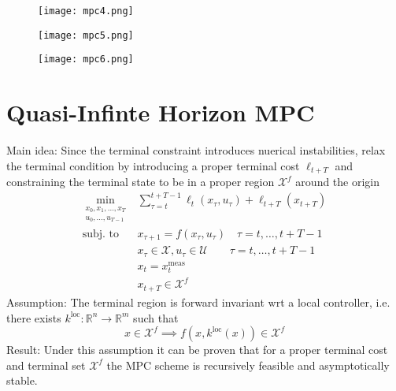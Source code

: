 \documentclass[openany]{book}
\newcommand{\R}{\mathbb{R}}               %
\theoremstyle{definition}
\theoremstyle{remark}
\begin{document}
\begin{figure}[ht]
    \centering
    \texttt{[image: mpc4.png]}
    \label{fig:mpc4}
\end{figure}

\begin{figure}[ht]
    \centering
    \texttt{[image: mpc5.png]}
    \label{fig:mpc5}
\end{figure}

\begin{figure}[ht]
    \centering
    \texttt{[image: mpc6.png]}
    \label{fig:mpc6}
\end{figure}

\pagebreak

\section{Quasi-Infinte Horizon MPC}
Main idea: Since the terminal constraint introduces nuerical instabilities, relax the terminal condition by introducing a proper terminal cost $\ell_{t+T}$ and constraining the terminal state to be in a proper region $\mathcal{X}^f$ around the origin
\begin{align*}
    \min_{\substack{x_0,x_1,\dots,x_T\\u_0,\dots,u_{T-1}}} & \displaystyle\sum_{\tau=t}^{t+T-1}\ell_t(x_\tau,u_\tau)+\ell_{t+T}(x_{t+T})\\
        \text{subj.\ to } & x_{\tau+1}=f(x_\tau,u_\tau) \quad \tau=t,\dots,t+T-1\\
                          & x_\tau \in \mathcal{X}, u_\tau \in \mathcal{U} \qquad \tau=t,\dots,t+T-1\\ 
                          & x_t = x_t^{\text{meas}} \\
                          & x_{t+T}\in\mathcal{X}^f
\end{align*}
Assumption: The terminal region is forward invariant wrt a local controller, i.e. there exists $k^{\text{loc}}:\R^n\to\R^m$ such that 
\[
    x\in\mathcal{X}^f \implies f(x,k^{\text{loc}}(x))\in\mathcal{X}^f
\]
Result: Under this assumption it can be proven that for a proper terminal cost and terminal set $\mathcal{X}^f$ the MPC scheme is recursively feasible and asymptotically stable.
\end{document}
